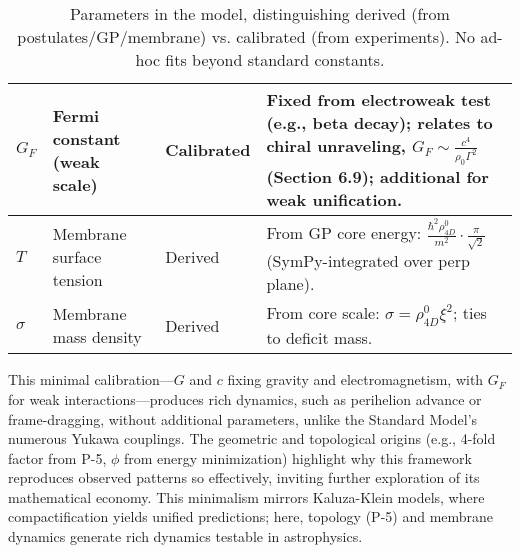 \begin{table}[H]
\begin{tabularx}{\linewidth}{|p{1.5cm}|p{2cm}|l|Y|}
\hline
$G_F$ & Fermi constant (weak scale) & Calibrated & Fixed from electroweak test (e.g., beta decay); relates to chiral unraveling, $G_F \sim \frac{c^4}{\rho_0 \Gamma^2}$ (Section 6.9); additional for weak unification. \\
\hline
$T$ & Membrane surface tension & Derived & From GP core energy: $\frac{\hbar^2 \rho_{4D}^0}{m^2} \cdot \frac{\pi}{\sqrt{2}}$ (SymPy-integrated over perp plane). \\
\hline
$\sigma$ & Membrane mass density & Derived & From core scale: $\sigma = \rho_{4D}^0 \xi^2$; ties to deficit mass. \\
\hline
\end{tabularx}
\caption{Parameters in the model, distinguishing derived (from postulates/GP/membrane) vs. calibrated (from experiments). No ad-hoc fits beyond standard constants.}
\label{tab:parameters}
\end{table}

This minimal calibration---$G$ and $c$ fixing gravity and electromagnetism, with $G_F$ for weak interactions---produces rich dynamics, such as perihelion advance or frame-dragging, without additional parameters, unlike the Standard Model's numerous Yukawa couplings. The geometric and topological origins (e.g., 4-fold factor from P-5, $\phi$ from energy minimization) highlight why this framework reproduces observed patterns so effectively, inviting further exploration of its mathematical economy. This minimalism mirrors Kaluza-Klein models, where compactification yields unified predictions; here, topology (P-5) and membrane dynamics generate rich dynamics testable in astrophysics.

\medskip
\noindent
{}
\medskip


